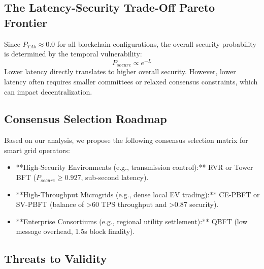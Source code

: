 \documentclass[10pt,twocolumn,journal]{IEEEtran}
\begin{document}
\subsection{The Latency-Security Trade-Off Pareto Frontier}

Since $P_{TAb} \approx 0.0$ for all blockchain configurations, the overall security probability is determined by the temporal vulnerability:
\begin{equation}
P_{secure} \propto e^{-L}
\end{equation}
Lower latency directly translates to higher overall security. However, lower latency often requires smaller committees or relaxed consensus constraints, which can impact decentralization.

\subsection{Consensus Selection Roadmap}

Based on our analysis, we propose the following consensus selection matrix for smart grid operators:

\begin{itemize}[leftmargin=*]
    \item **High-Security Environments (e.g., transmission control):** RVR or Tower BFT ($P_{secure} \geq 0.927$, sub-second latency).
    \item **High-Throughput Microgrids (e.g., dense local EV trading):** CE-PBFT or SV-PBFT (balance of >60 TPS throughput and >0.87 security).
    \item **Enterprise Consortiums (e.g., regional utility settlement):** QBFT (low message overhead, 1.5s block finality).
\end{itemize}

\subsection{Threats to Validity}
\end{document}
